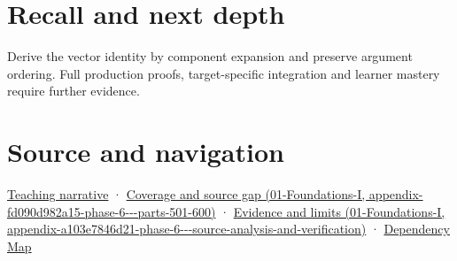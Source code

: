 \section{Recall and next depth}\label{appendix-5caa058bd9c7-recall-and-next-depth}

Derive the vector identity by component expansion and preserve argument ordering. Full production proofs, target-specific integration and learner mastery require further evidence.

\section{Source and navigation}\label{appendix-5caa058bd9c7-source-and-navigation}

\href{Continuous\%20Notes/Computing\%20Foundations\%20-\%20From\%20Bits\%20to\%20C++\%20and\%20Systems\%20APIs\#Signed\%20volume\%20extends\%20the\%20same\%20idea\%20into\%20space}{Teaching narrative} · \href{../01-Foundations-I/main.pdf\#nameddest=appendix-fd090d982a15-phase-6---parts-501-600}{Coverage and source gap (01-Foundations-I, appendix-fd090d982a15-phase-6-\/-\/-parts-501-600)} · \href{../01-Foundations-I/main.pdf\#nameddest=appendix-a103e7846d21-phase-6---source-analysis-and-verification}{Evidence and limits (01-Foundations-I, appendix-a103e7846d21-phase-6-\/-\/-source-analysis-and-verification)} · \hyperref[appendix-4ad47bdd269a]{Dependency Map}
